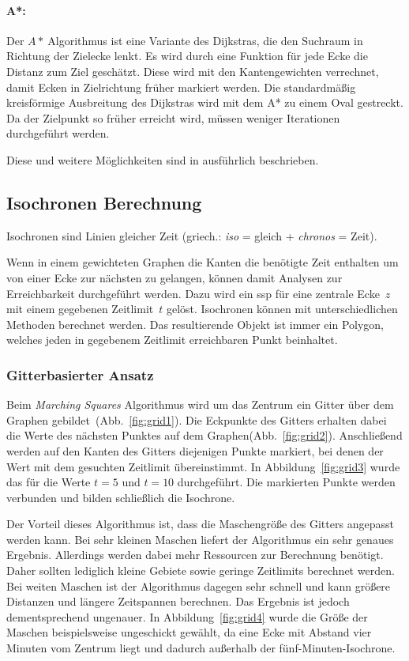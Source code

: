 \paragraph*{A*:}
Der $A*~$Algorithmus ist eine Variante des Dijkstras, die den Suchraum in Richtung der Zielecke lenkt.
Es wird durch eine Funktion für jede Ecke die Distanz zum Ziel geschätzt.
Diese wird mit den Kantengewichten verrechnet, damit Ecken in Zielrichtung früher markiert werden.
Die standardmäßig kreisförmige Ausbreitung des Dijkstras wird mit dem A* zu einem Oval gestreckt.
Da der Zielpunkt so früher erreicht wird, müssen weniger Iterationen durchgeführt werden.

Diese und weitere Möglichkeiten sind in \cite[209--213]{kurt} ausführlich beschrieben.

\newpage
\subsection{Isochronen Berechnung}

Isochronen sind Linien gleicher Zeit (griech.: \textit{iso} = gleich + \textit{chronos} = Zeit).

Wenn in einem gewichteten Graphen die Kanten die benötigte Zeit enthalten um von einer Ecke zur nächsten zu gelangen, können damit Analysen zur Erreichbarkeit durchgeführt werden.
Dazu wird ein \gls{ssp} für eine zentrale Ecke~$z$ mit einem gegebenen Zeitlimit~$t$ gelöst.
Isochronen können mit unterschiedlichen Methoden berechnet werden.
Das resultierende Objekt ist immer ein Polygon, welches jeden in gegebenem Zeitlimit erreichbaren Punkt beinhaltet.


\subsubsection{Gitterbasierter Ansatz}

Beim \textit{Marching Squares} Algorithmus wird um das Zentrum ein Gitter über dem Graphen gebildet~(Abb.~\ref{fig:grid1}).
Die Eckpunkte des Gitters erhalten dabei die Werte des nächsten Punktes auf dem Graphen(Abb.~\ref{fig:grid2}).
Anschließend werden auf den Kanten des Gitters diejenigen Punkte markiert, bei denen der Wert mit dem gesuchten Zeitlimit übereinstimmt.
In Abbildung~\ref{fig:grid3} wurde das für die Werte $t=5$ und $t=10$ durchgeführt.
Die markierten Punkte werden verbunden und bilden schließlich die Isochrone.

Der Vorteil dieses Algorithmus ist, dass die Maschengröße des Gitters angepasst werden kann.
Bei sehr kleinen Maschen liefert der Algorithmus ein sehr genaues Ergebnis.
Allerdings werden dabei mehr Ressourcen zur Berechnung benötigt.
Daher sollten lediglich kleine Gebiete sowie geringe Zeitlimits berechnet werden.
Bei weiten Maschen ist der Algorithmus dagegen sehr schnell und kann größere Distanzen und längere Zeitspannen berechnen.
Das Ergebnis ist jedoch dementsprechend ungenauer.
In Abbildung~\ref{fig:grid4} wurde die Größe der Maschen beispielsweise ungeschickt gewählt, da eine Ecke mit Abstand vier Minuten vom Zentrum liegt und dadurch außerhalb der fünf-Minuten-Isochrone.

